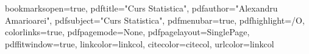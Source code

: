\hypersetup
{
bookmarksopen=true,
pdftitle="Curs Statistica",
pdfauthor="Alexandru Amarioarei",
pdfsubject="Curs Statistica", %
pdfmenubar=true, %
pdfhighlight=/O, %
colorlinks=true, %
pdfpagemode=None, %
pdfpagelayout=SinglePage, %
pdffitwindow=true, %
linkcolor=linkcol, %
citecolor=citecol, %
urlcolor=linkcol %
}


\renewcommand*{\backref}[1]{}
\renewcommand*{\backreftwosep}{ și~} %
\renewcommand*{\backreflastsep}{ și~} %
\renewcommand*{\backrefalt}[4]{%
    \ifcase #1 (Necitat.)%
    \or        (Citat la pagina~#2.)%
    \else      (Citat la paginile~#2.)%
    \fi}

\def\om{\omega}
\def\Om{\Omega}
\def\et{\eta}
\def\td{\tilde{\delta}}
\def\m{{\mu}}
\def\n{{\nu}}
\def\k{{\kappa}}
\def\l{{\lambda}}
\def\L{{\Lambda}}
\def\g{{\gamma}}
\def\a{{\alpha}}
\def\e{{\varepsilon}}
\def\b{{\beta}}
\def\G{{\Gamma}}
\def\d{{\delta}}
\def\D{{\Delta}}
\def\t{{\theta}}
\def\s{{\sigma}}
\def\S{{\Sigma}}
\def\z{{\zeta}}
\def\qed{\hfill\Box}
\def\ds{\displaystyle}
\def\mc{\mathcal}
\def\1{{\mathbf 1}}
\def\CC{{\mathbb C}}
\def\VV{{\mathbb V}}
\def\RR{{\mathbb R}}
\def\QQ{{\mathbb Q}}
\def\ZZ{{\mathbb Z}}
\def\PP{{\mathbb P}}
\def\EE{{\mathbb E}}
\def\NN{{\mathbb N}}
\def\FF{{\mathbb F}}
\def\MA{{\mathcal A}}
\def\MO{{\mathcal O}}
\def\MF{{\mathcal F}}
\def\ME{{\mathcal E}}
\def\MR{{\mathcal R}}
\def\MB{{\mathcal B}}
\def\MM{{\mathcal M}}
\def\MN{{\mathcal N}}
\def\MU{{\mathcal U}}
\def\MP{{\mathcal P}}
\def\MS{{\mathcal S}}
\def\MBS{{\mathbf S}}
\def\MX{{\bm{ \mathscr X}}}

\newcommand\independent{\protect\mathpalette{\protect\independenT}{\perp}}
\def\independenT#1#2{\mathrel{\rlap{$#1#2$}\mkern2mu{#1#2}}}

